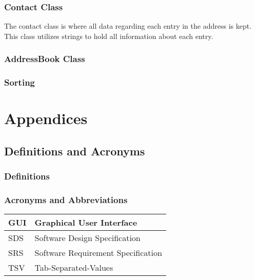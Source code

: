 \documentclass[a4paper, 11pt]{article}
\begin{document}
\subsubsection{Contact Class}
The contact class is where all data regarding each entry in the address is kept. This class utilizes strings to hold all information about each entry. 











\subsubsection{AddressBook Class}





\subsubsection{Sorting}









\section{Appendices}

\subsection{Definitions and Acronyms}
\subsubsection{Definitions}
\subsubsection{Acronyms and Abbreviations}

	\begin{tabular}{ | m{1cm} | m{10cm} | } 
		\hline
		GUI & Graphical User Interface \\
		\hline
		SDS & Software Design Specification \\
		\hline
		SRS & Software Requirement Specification  \\
		\hline
		TSV & Tab-Separated-Values \\
		\hline
	\end{tabular}
\end{document}
